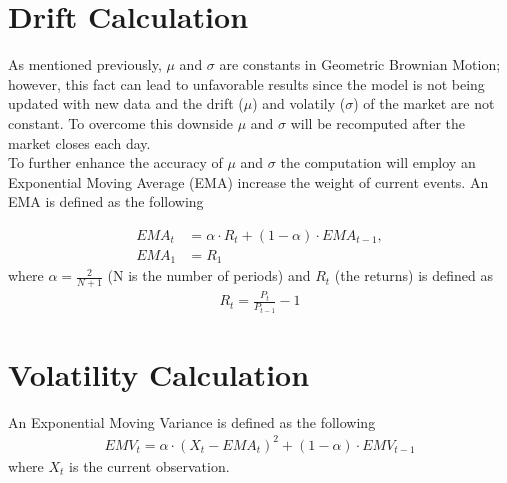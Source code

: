 \documentclass{article}
\begin{document}
\section{Drift Calculation}
As mentioned previously, $\mu$ and $\sigma$ are constants in Geometric Brownian Motion; however, this fact can lead to unfavorable results since the model is not being updated with new data and the drift ($\mu$) and volatily ($\sigma$) of the market are not constant. To overcome this downside $\mu$ and $\sigma$ will be recomputed after the market closes each day.\\
\noindent
To further enhance the accuracy of $\mu$ and $\sigma$ the computation will employ an Exponential Moving Average (EMA) increase the weight of current events. An EMA is defined as the following

\begin{align}
	EMA_t &= \alpha \cdot R_t + (1 - \alpha) \cdot EMA_{t-1},\\
	EMA_1 &= R_1
\end{align}
 where $\alpha  = \frac{2}{N + 1}$ (N is the number of periods) and $R_t$ (the returns) is defined as 
\begin{align}
	R_t = \frac{P_t}{P_{t-1}} - 1
\end{align}

\section{Volatility Calculation}
An Exponential Moving Variance is defined as the following
\begin{align}
	EMV_t = \alpha \cdot \left( X_t - EMA_t \right)^2 + (1 - \alpha) \cdot EMV_{t-1}
\end{align}
where $X_t$ is the current observation.


\end{document}
